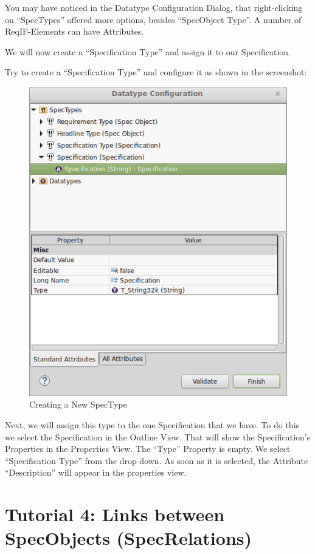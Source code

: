 You may have noticed in the Datatype Configuration Dialog, that right-clicking on ``SpecTypes'' offered more options, besides ``SpecObject Type''.  A number of ReqIF-Elements can have Attributes.

We will now create a ``Specification Type'' and assign it to our Specification.

Try to create a ``Specification Type'' and configure it as shown in the screenshot:

\begin{figure}[h!]
\centering      
\includegraphics[width=0.8\linewidth]{../rmf-images/new_spectype.png}      
\caption{Creating a New SpecType}      
\label{fig:newSpecType}
\end{figure}

Next, we will assign this type to the one Specification that we have.  To do this we select the Specification in the Outline View.  That will show
the Specification's Properties in the Properties View.  The ``Type'' Property is empty.  We select ``Specification Type'' from the drop down.
As soon as it is selected, the Attribute ``Description'' will appear in the properties view.

\section{Tutorial 4: Links between SpecObjects (SpecRelations)}

